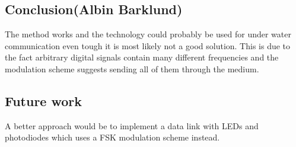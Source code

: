 \subsection{Conclusion(Albin Barklund)}
The method works and the technology could probably be used for under water communication even tough it is most likely not a good solution. This is due to the fact arbitrary digital signals contain many different frequencies and the modulation scheme suggests sending all of them through the medium.

\subsection{Future work}
A better approach would be to implement a data link with LEDs and photodiodes which uses a FSK modulation scheme instead.

















